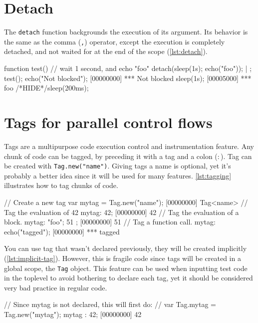 \section{Detach}

The \texttt{detach} function backgrounds the execution of its
argument. Its behavior is the same as the comma (\texttt{,}) operator,
except the execution is completely detached, and not waited for at the
end of the scope (\autoref{lst:detach}).

\begin{urbiscript}[caption=Detach, label=lst:detach]
function test()
{
  // wait 1 second, and echo "foo"
  detach({sleep(1s); echo("foo")});
} | {};
test();
echo("Not blocked");
[00000000] *** Not blocked
sleep(1s);
[00005000] *** foo
/*HIDE*/sleep(200ms);
\end{urbiscript}

\section{Tags for parallel control flows}

Tags are a multipurpose code execution control and instrumentation
feature. Any chunk of code can be tagged, by preceding it with a tag
and a colon (\texttt{$:$}). Tag can be created with
\lstinline|Tag.new("name")|. Giving tags a name is optional, yet it's
probably a better idea since it will be used for many
features. \autoref{lst:tagging} illustrates how to tag chunks of code.

\begin{urbiscript}[caption=Tagging a block of code, label=lst:tagging]
// Create a new tag
var mytag = Tag.new("name");
[00000000] Tag<name>
// Tag the evaluation of 42
mytag: 42;
[00000000] 42
// Tag the evaluation of a block.
mytag: { "foo"; 51 };
[00000000] 51
// Tag a function call.
mytag: echo("tagged");
[00000000] *** tagged
\end{urbiscript}

You can use tag that wasn't declared previously, they will be created
implicitly (\autoref{lst:implicit-tag}). However, this is fragile code since
tags will be created in a global scope, the \texttt{Tag} object. This
feature can be used when inputting test code in the toplevel to avoid
bothering to declare each tag, yet it should be considered very bad
practice in regular code.

\begin{urbiscript}[caption=Tag created implicitly,
label=lst:implicit-tag]
// Since mytag is not declared, this will first do:
// var Tag.mytag = Tag.new("mytag");
mytag : 42;
[00000000] 42
\end{urbiscript}

